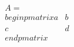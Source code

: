 \documentclass[preview]{standalone}
\begin{document}
\begin{align*}
A = \\begin{pmatrix} a & b \\ c & d \\end{pmatrix}
\end{align*}
\end{document}

